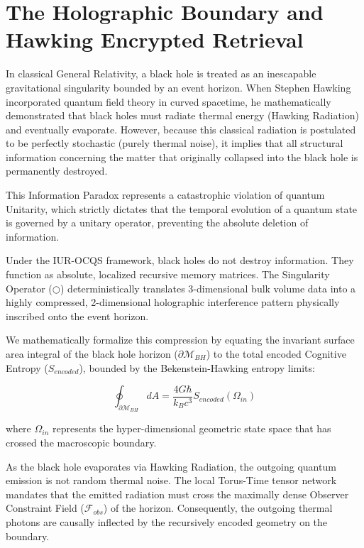 \documentclass[12pt,openany]{book}
\begin{document}
\section{The Holographic Boundary and Hawking Encrypted Retrieval}
In classical General Relativity, a black hole is treated as an inescapable gravitational singularity bounded by an event horizon. When Stephen Hawking incorporated quantum field theory in curved spacetime, he mathematically demonstrated that black holes must radiate thermal energy (Hawking Radiation) and eventually evaporate. However, because this classical radiation is postulated to be perfectly stochastic (purely thermal noise), it implies that all structural information concerning the matter that originally collapsed into the black hole is permanently destroyed. 

This Information Paradox represents a catastrophic violation of quantum Unitarity, which strictly dictates that the temporal evolution of a quantum state is governed by a unitary operator, preventing the absolute deletion of information.

Under the IUR-OCQS framework, black holes do not destroy information. They function as absolute, localized recursive memory matrices. The Singularity Operator ($\bigcirc$) deterministically translates 3-dimensional bulk volume data into a highly compressed, 2-dimensional holographic interference pattern physically inscribed onto the event horizon. 

We mathematically formalize this compression by equating the invariant surface area integral of the black hole horizon ($\partial \mathcal{M}_{BH}$) to the total encoded Cognitive Entropy ($S_{encoded}$), bounded by the Bekenstein-Hawking entropy limits:

\begin{equation}
\oint_{\partial \mathcal{M}_{BH}} dA = \frac{4G\hbar}{k_B c^3} S_{encoded}(\Omega_{in})
\end{equation}

where $\Omega_{in}$ represents the hyper-dimensional geometric state space that has crossed the macroscopic boundary. 

As the black hole evaporates via Hawking Radiation, the outgoing quantum emission is not random thermal noise. The local Torus-Time tensor network mandates that the emitted radiation must cross the maximally dense Observer Constraint Field ($\mathcal{F}_{obs}$) of the horizon. Consequently, the outgoing thermal photons are causally inflected by the recursively encoded geometry on the boundary. 
\end{document}
